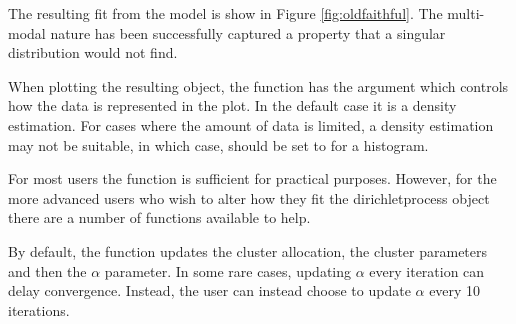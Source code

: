 \documentclass[nojss]{jss}
\begin{document}
The resulting fit from the model is show in Figure \ref{fig:oldfaithful}. The multi-modal nature has been successfully captured a property that a singular distribution would not find.

When plotting the resulting object, the  function has the argument  which controls how the data is represented in the plot. In the default case it is a density estimation. For cases where the amount of data is limited, a density estimation may not be suitable, in which case,  should be set to  for a histogram.

For most users the  function is sufficient for practical purposes. However, for the more advanced users who wish to alter how they fit the dirichletprocess object there are a number of functions available to help.

By default, the  function updates the cluster allocation, the cluster parameters and then the $\alpha$ parameter. In some rare cases, updating $\alpha$ every iteration can delay convergence. Instead, the user can instead choose to update $\alpha$ every 10 iterations.
\newpage %
\begin{Schunk}
\end{Schunk}
\end{document}

